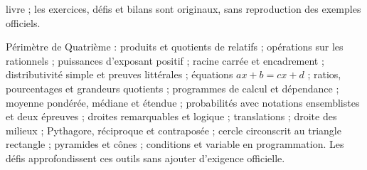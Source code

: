livre ; les exercices, défis et bilans sont originaux, sans reproduction des
exemples officiels.\par\medskip
Périmètre de Quatrième : produits et quotients de relatifs ; opérations sur les
rationnels ; puissances d’exposant positif ; racine carrée et encadrement ;
distributivité simple et preuves littérales ; équations $ax+b=cx+d$ ; ratios,
pourcentages et grandeurs quotients ; programmes de calcul et dépendance ;
moyenne pondérée, médiane et étendue ; probabilités avec notations ensemblistes
et deux épreuves ; droites remarquables et logique ; translations ; droite des
milieux ; Pythagore, réciproque et contraposée ; cercle circonscrit au triangle
rectangle ; pyramides et cônes ; conditions et variable en programmation.
Les défis approfondissent ces outils sans ajouter d’exigence officielle.

\clearpage
